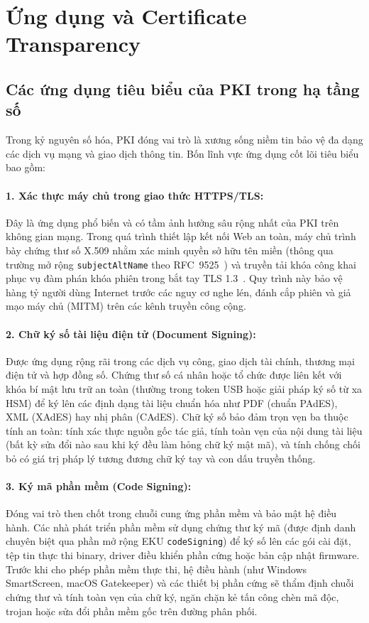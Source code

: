 \section{Ứng dụng và Certificate Transparency}
\label{sec:certificate-transparency}

\subsection{Các ứng dụng tiêu biểu của PKI trong hạ tầng số}
\label{subsec:pki-applications}

Trong kỷ nguyên số hóa, PKI đóng vai trò là xương sống niềm tin bảo vệ đa dạng các dịch vụ mạng và giao dịch thông tin. Bốn lĩnh vực ứng dụng cốt lõi tiêu biểu bao gồm:

\paragraph{1. Xác thực máy chủ trong giao thức HTTPS/TLS:}
Đây là ứng dụng phổ biến và có tầm ảnh hưởng sâu rộng nhất của PKI trên không gian mạng. Trong quá trình thiết lập kết nối Web an toàn, máy chủ trình bày chứng thư số X.509 nhằm xác minh quyền sở hữu tên miền (thông qua trường mở rộng \texttt{subjectAltName} theo RFC~9525~\cite{rfc9525}) và truyền tải khóa công khai phục vụ đàm phán khóa phiên trong bắt tay TLS 1.3~\cite{rfc8446}. Quy trình này bảo vệ hàng tỷ người dùng Internet trước các nguy cơ nghe lén, đánh cắp phiên và giả mạo máy chủ (MITM) trên các kênh truyền công cộng.

\paragraph{2. Chữ ký số tài liệu điện tử (Document Signing):}
Được ứng dụng rộng rãi trong các dịch vụ công, giao dịch tài chính, thương mại điện tử và hợp đồng số. Chứng thư số cá nhân hoặc tổ chức được liên kết với khóa bí mật lưu trữ an toàn (thường trong token USB hoặc giải pháp ký số từ xa HSM) để ký lên các định dạng tài liệu chuẩn hóa như PDF (chuẩn PAdES), XML (XAdES) hay nhị phân (CAdES). Chữ ký số bảo đảm trọn vẹn ba thuộc tính an toàn: tính xác thực nguồn gốc tác giả, tính toàn vẹn của nội dung tài liệu (bất kỳ sửa đổi nào sau khi ký đều làm hỏng chữ ký mật mã), và tính chống chối bỏ có giá trị pháp lý tương đương chữ ký tay và con dấu truyền thống.

\paragraph{3. Ký mã phần mềm (Code Signing):}
Đóng vai trò then chốt trong chuỗi cung ứng phần mềm và bảo mật hệ điều hành. Các nhà phát triển phần mềm sử dụng chứng thư ký mã (được định danh chuyên biệt qua phần mở rộng EKU \texttt{codeSigning}) để ký số lên các gói cài đặt, tệp tin thực thi binary, driver điều khiển phần cứng hoặc bản cập nhật firmware. Trước khi cho phép phần mềm thực thi, hệ điều hành (như Windows SmartScreen, macOS Gatekeeper) và các thiết bị phần cứng sẽ thẩm định chuỗi chứng thư và tính toàn vẹn của chữ ký, ngăn chặn kẻ tấn công chèn mã độc, trojan hoặc sửa đổi phần mềm gốc trên đường phân phối.

